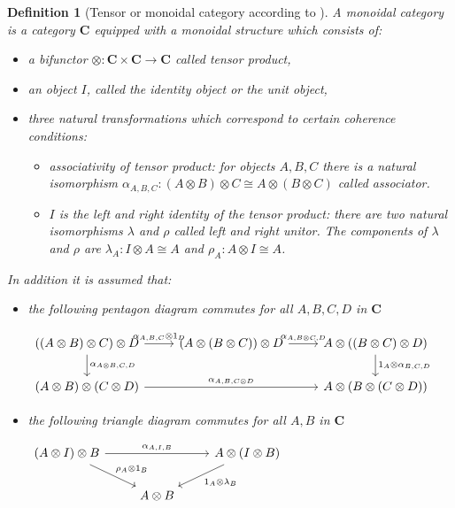 \documentclass[letterpaper,11pt]{article}
\newtheorem{definition}{Definition}
\begin{document}
	\begin{definition}[Tensor or monoidal category according to \cite{wiki-tensor}]
		 A monoidal category is a category $\boldsymbol{C}$ equipped with a monoidal structure which consists of:
		\begin{itemize}
			\item a bifunctor $\otimes : \boldsymbol{C} \times \boldsymbol{C} \rightarrow \boldsymbol{C}$ called tensor product,
			\item an object $I$, called the identity object or the unit object,
			\item three natural transformations which correspond to certain coherence conditions:
				\begin{itemize}
					\item associativity of tensor product: for objects $A,B,C$ there is a natural isomorphism $\alpha_{A,B,C}:(A\otimes B)\otimes C \cong A \otimes (B \otimes C)$ called associator.
					\item $I$ is the left and right identity of the tensor product: there are two natural isomorphisms $\lambda$ and $\rho$ called left and right unitor. The components of $\lambda$ and $\rho$ are $\lambda_A: I\otimes A \cong A$ and $\rho_A: A\otimes I \cong A$.
				\end{itemize}
		\end{itemize}
		In addition it is assumed that:
		\begin{itemize}
			\item the following pentagon diagram commutes for all $A, B, C, D$ in $\boldsymbol{C}$
							
			$\begin{tikzcd}
				((A\otimes B) \otimes C) \otimes D \ar[r, "\alpha_{A,B,C}\otimes 1_D"] \ar[d, "\alpha_{A \otimes B,C, D}"] & (A \otimes (B \otimes C)) \otimes D \ar[r, "\alpha_{A,B \otimes C,D}"] & A \otimes ((B \otimes C) \otimes D) \ar[d, "1_A \otimes \alpha_{B,C,D}"] \\
				(A \otimes B) \otimes (C \otimes D) \ar[rr, "\alpha_{A,B,C \otimes D}"] & & A\otimes (B \otimes (C \otimes D))
			\end{tikzcd}$
		
			\item the following triangle diagram commutes for all $A, B$ in $\boldsymbol{C}$
			
			$\begin{tikzcd}
				(A \otimes I) \otimes B \ar[rr, "\alpha_{A,I,B}"] \ar[dr, "\rho_A \otimes 1_B"] & & A \otimes (I \otimes B) \ar[ld, "1_A \otimes \lambda_B"] \\
				  & A \otimes B
			\end{tikzcd}$
		\end{itemize}

	\end{definition}
\end{document}

